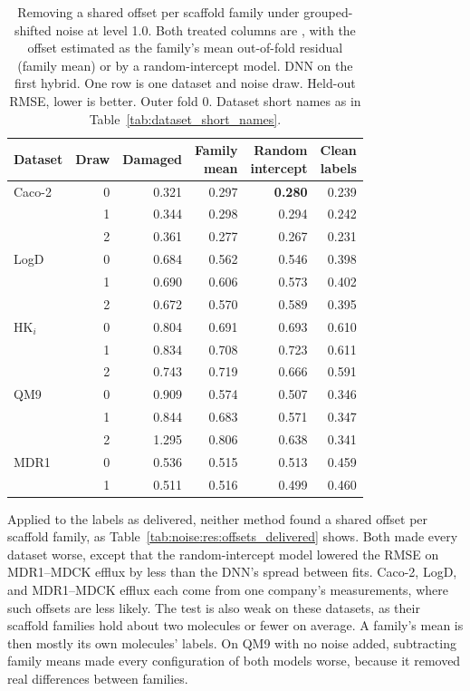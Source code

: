 \begin{table}[htbp]
\centering
\begin{tabular}{@{}lrrrrr@{}}
\toprule
Dataset & Draw & Damaged & \makecell[r]{Family\\mean} & \makecell[r]{Random\\intercept} & \makecell[r]{Clean\\labels} \\
\midrule
Caco-2 & 0 & 0.321 & 0.297 & \textbf{0.280} & 0.239 \\
 & 1 & 0.344 & 0.298 & 0.294 & 0.242 \\
 & 2 & 0.361 & 0.277 & 0.267 & 0.231 \\
LogD & 0 & 0.684 & 0.562 & 0.546 & 0.398 \\
 & 1 & 0.690 & 0.606 & 0.573 & 0.402 \\
 & 2 & 0.672 & 0.570 & 0.589 & 0.395 \\
HK$_i$ & 0 & 0.804 & 0.691 & 0.693 & 0.610 \\
 & 1 & 0.834 & 0.708 & 0.723 & 0.611 \\
 & 2 & 0.743 & 0.719 & 0.666 & 0.591 \\
QM9 & 0 & 0.909 & 0.574 & 0.507 & 0.346 \\
 & 1 & 0.844 & 0.683 & 0.571 & 0.347 \\
 & 2 & 1.295 & 0.806 & 0.638 & 0.341 \\
MDR1 & 0 & 0.536 & 0.515 & 0.513 & 0.459 \\
 & 1 & 0.511 & 0.516 & 0.499 & 0.460 \\
\bottomrule
\end{tabular}
\caption[Removing a shared offset per scaffold family.]{Removing a shared offset per scaffold family under grouped-shifted noise at level 1.0. Both treated columns are , with the offset estimated as the family's mean out-of-fold residual (family mean) or by a random-intercept model. DNN on the first hybrid. One row is one dataset and noise draw. Held-out RMSE, lower is better. Outer fold 0. Dataset short names as in Table~\ref{tab:dataset_short_names}.}
\label{tab:noise:res:family_offsets}
\end{table}

Applied to the labels as delivered, neither method found a shared offset per scaffold family, as Table~\ref{tab:noise:res:offsets_delivered} shows. Both made every dataset worse, except that the random-intercept model lowered the RMSE on MDR1--MDCK efflux by less than the DNN's spread between fits. Caco-2, LogD, and MDR1--MDCK efflux each come from one company's measurements, where such offsets are less likely. The test is also weak on these datasets, as their scaffold families hold about two molecules or fewer on average. A family's mean is then mostly its own molecules' labels. On QM9 with no noise added, subtracting family means made every configuration of both models worse, because it removed real differences between families.

